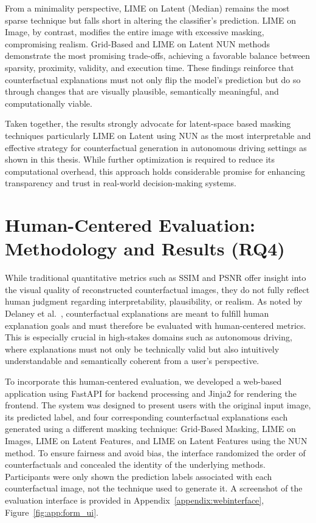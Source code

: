 From a minimality perspective, LIME on Latent (Median) remains the most sparse technique but falls short in altering the classifier’s prediction. LIME on Image, by contrast, modifies the entire image with excessive masking, compromising realism. Grid-Based and LIME on Latent NUN methods demonstrate the most promising trade-offs, achieving a favorable balance between sparsity, proximity, validity, and execution time. These findings reinforce that counterfactual explanations must not only flip the model's prediction but do so through changes that are visually plausible, semantically meaningful, and computationally viable.

Taken together, the results strongly advocate for latent-space based masking techniques particularly LIME on Latent using NUN as the most interpretable and effective strategy for counterfactual generation in autonomous driving settings as shown in this thesis. While further optimization is required to reduce its computational overhead, this approach holds considerable promise for enhancing transparency and trust in real-world decision-making systems.





\section{Human-Centered Evaluation: Methodology and Results (RQ4)} \label{sec:human_evaluation}

While traditional quantitative metrics such as SSIM and PSNR offer insight into the visual quality of reconstructed counterfactual images, they do not fully reflect human judgment regarding interpretability, plausibility, or realism. As noted by Delaney et al.~\cite{DELANEY2023103995}, counterfactual explanations are meant to fulfill human explanation goals and must therefore be evaluated with human-centered metrics. This is especially crucial in high-stakes domains such as autonomous driving, where explanations must not only be technically valid but also intuitively understandable and semantically coherent from a user's perspective.

To incorporate this human-centered evaluation, we developed a web-based application using FastAPI for backend processing and Jinja2 for rendering the frontend. The system was designed to present users with the original input image, its predicted label, and four corresponding counterfactual explanations each generated using a different masking technique: Grid-Based Masking, LIME on Images, LIME on Latent Features, and LIME on Latent Features using the NUN method. To ensure fairness and avoid bias, the interface randomized the order of counterfactuals and concealed the identity of the underlying methods. Participants were only shown the prediction labels associated with each counterfactual image, not the technique used to generate it. A screenshot of the evaluation interface is provided in Appendix~\ref{appendix:webinterface}, Figure~\ref{fig:app:form_ui}.

